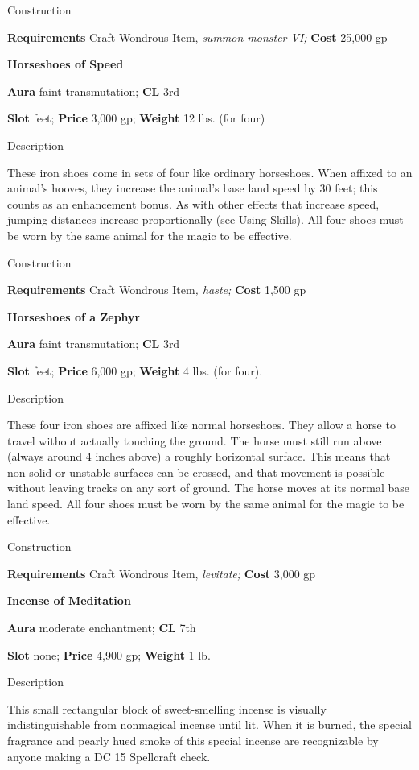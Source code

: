 Construction
				
\textbf{Requirements} Craft Wondrous Item,\textit{ summon monster VI;}\textbf{ Cost }25,000 gp
				
\textbf{Horseshoes of Speed}
				
\textbf{Aura} faint transmutation;\textbf{ CL }3rd
				
\textbf{Slot} feet; \textbf{Price} 3,000 gp; \textbf{Weight} 12 lbs. (for four)
				
Description
				
These iron shoes come in sets of four like ordinary horseshoes. When affixed to an animal's hooves, they increase the animal's base land speed by 30 feet; this counts as an enhancement bonus. As with other effects that increase speed, jumping distances increase proportionally (see Using Skills). All four shoes must be worn by the same animal for the magic to be effective. 
				
Construction
				
\textbf{Requirements} Craft Wondrous Item\textit{, haste;}\textbf{ Cost }1,500 gp
				
\textbf{Horseshoes of a Zephyr}
				
\textbf{Aura} faint transmutation;\textbf{ CL }3rd
				
\textbf{Slot} feet; \textbf{Price} 6,000 gp; \textbf{Weight} 4 lbs. (for four).
				
Description
				
These four iron shoes are affixed like normal horseshoes. They allow a horse to travel without actually touching the ground. The horse must still run above (always around 4 inches above) a roughly horizontal surface. This means that non-solid or unstable surfaces can be crossed, and that movement is possible without leaving tracks on any sort of ground. The horse moves at its normal base land speed. All four shoes must be worn by the same animal for the magic to be effective. 
				
Construction
				
\textbf{Requirements} Craft Wondrous Item, \textit{levitate;}\textbf{ Cost }3,000 gp
				
\textbf{Incense of Meditation}
				
\textbf{Aura} moderate enchantment;\textbf{ CL }7th
				
\textbf{Slot} none; \textbf{Price} 4,900 gp; \textbf{Weight} 1 lb.
				
Description
				
This small rectangular block of sweet-smelling incense is visually indistinguishable from nonmagical incense until lit. When it is burned, the special fragrance and pearly hued smoke of this special incense are recognizable by anyone making a DC 15 Spellcraft check.
				
